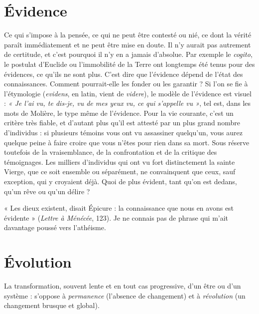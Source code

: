 \section{Évidence}
Ce qui s’impose à la pensée, ce qui ne peut être contesté ou nié,
ce dont la vérité paraît immédiatement et ne peut être mise en
doute. Il n’y aurait pas autrement de certitude, et c’est pourquoi il n’y en a
jamais d’absolue. Par exemple le {\it cogito}, le postulat d’Euclide ou l’immobilité de
la Terre ont longtemps été tenus pour des évidences, ce qu’ils ne sont plus.
C’est dire que l’évidence dépend de l’état des connaissances. Comment pourrait-elle
les fonder ou les garantir ?
Si l’on se fie à l’étymologie ({\it evidens}, en latin, vient de {\it videre}), le modèle de
l'évidence est visuel : {\it « Je l'ai vu, te dis-je, vu de mes yeux vu, ce qui s'appelle vu »},
tel est, dans les mots de Molière, le type même de l’évidence. Pour la vie courante,
c’est un critère très fiable, et d’autant plus qu’il est attesté par un plus
grand nombre d'individus : si plusieurs témoins vous ont vu assassiner
quelqu'un, vous aurez quelque peine à faire croire que vous n'êtes pour rien
dans sa mort. Sous réserve toutefois de la vraisemblance, de la confrontation
et de la critique des témoignages. Les milliers d'individus qui ont vu fort distinctement
la sainte Vierge, que ce soit ensemble ou séparément, ne convainquent
que ceux, sauf exception, qui y croyaient déjà. Quoi de plus évident, tant
qu’on est dedans, qu’un rêve ou qu’un délire ?

« Les dieux existent, disait Épicure : la connaissance que nous en avons est
évidente » ({\it Lettre à Ménécée}, 123). Je ne connais pas de phrase qui m’ait davantage
poussé vers l’athéisme.

\section{Évolution}
La transformation, souvent lente et en tout cas progressive,
d’un être ou d’un système : s’oppose à {\it permanence} (l'absence
de changement) et à {\it révolution} (un changement brusque et global).

